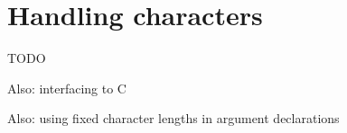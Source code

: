 \section{Handling characters}
TODO

Also: interfacing to C

Also: using fixed character lengths in argument declarations

